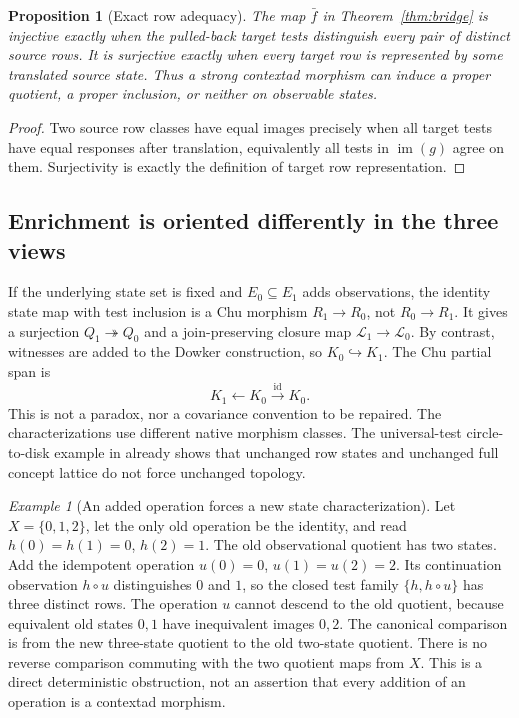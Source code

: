 \documentclass[11pt]{article}
\newtheorem{proposition}[theorem]{Proposition}
\theoremstyle{definition}\newtheorem{definition}[theorem]{Definition}
\theoremstyle{remark}\newtheorem{remark}[theorem]{Remark}
\newtheorem{example}[theorem]{Example}
\newcommand{\id}{\mathrm{id}}
\newcommand{\im}{\operatorname{im}}
\begin{document}
\begin{proposition}[Exact row adequacy]
The map $\bar f$ in Theorem~\ref{thm:bridge} is injective exactly when the
pulled-back target tests distinguish every pair of distinct source rows.
It is surjective exactly when every target row is represented by some
translated source state. Thus a strong contextad morphism can induce a proper
quotient, a proper inclusion, or neither on observable states.
\end{proposition}
\begin{proof}
Two source row classes have equal images precisely when all target tests have
equal responses after translation, equivalently all tests in $\im(g)$ agree
on them. Surjectivity is exactly the definition of target row representation.
\end{proof}

\subsection{Enrichment is oriented differently in the three views}
If the underlying state set is fixed and $E_0\subseteq E_1$ adds observations,
the identity state map with test inclusion is a Chu morphism
$R_1\to R_0$, not $R_0\to R_1$. It gives a surjection
$Q_1\twoheadrightarrow Q_0$ and a join-preserving closure map
$\mathcal L_1\to\mathcal L_0$. By contrast, witnesses are added to the
Dowker construction, so $K_0\hookrightarrow K_1$. The Chu partial span is
\[
 K_1\longleftarrow K_0\xrightarrow{\id}K_0.
\]
This is not a paradox, nor a covariance convention to be repaired. The
characterizations use different native morphism classes. The universal-test
circle-to-disk example in \cite{Common} already shows that unchanged row
states and unchanged full concept lattice do not force unchanged topology.

\begin{example}[An added operation forces a new state characterization]
Let $X=\{0,1,2\}$, let the only old operation be the identity, and read
$h(0)=h(1)=0$, $h(2)=1$. The old observational quotient has two states.
Add the idempotent operation $u(0)=0$, $u(1)=u(2)=2$. Its continuation
observation $h\circ u$ distinguishes $0$ and $1$, so the closed test family
$\{h,h\circ u\}$ has three distinct rows. The operation $u$ cannot descend
to the old quotient, because equivalent old states $0,1$ have inequivalent
images $0,2$. The canonical comparison is from the new three-state quotient
to the old two-state quotient. There is no reverse comparison commuting with
the two quotient maps from $X$. This is a direct deterministic obstruction,
not an assertion that every addition of an operation is a contextad morphism.
\end{example}
\end{document}
